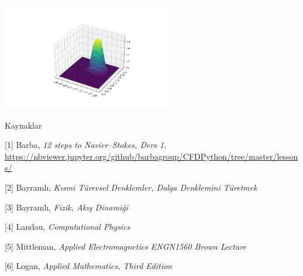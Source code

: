 \documentclass[12pt,fleqn]{article}\usepackage{../../common}
\begin{document}
\includegraphics[width=20em]{compscieng_app45cfd3_02.png}

Kaynaklar

[1] Barba, {\em 12 steps to Navier–Stokes, Ders 1},
    \url{https://nbviewer.jupyter.org/github/barbagroup/CFDPython/tree/master/lessons/}

[2] Bayramlı, {\em Kısmi Türevsel Denklemler, Dalga Denklemini Türetmek}

[3] Bayramlı, {\em Fizik, Akış Dinamiği}

[4] Landau, {\em Computational Physics}

[5] Mittleman, {\em Applied Electromagnetics ENGN1560 Brown Lecture}

[6] Logan, {\em Applied Mathematics, Third Edition}
\end{document}
